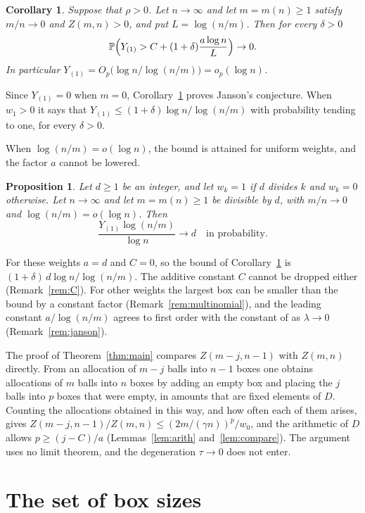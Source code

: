 \documentclass[11pt]{amsart}
\newtheorem{corollary}[theorem]{Corollary}
\newtheorem{proposition}[theorem]{Proposition}
\theoremstyle{remark}
\numberwithin{equation}{section}
\newcommand{\Pp}{\mathbb P}
\begin{document}
\begin{corollary}\label{cor:conj}
Suppose that $\rho>0$. Let $n\to\infty$ and let $m=m(n)\ge1$ satisfy $m/n\to0$ and $Z(m,n)>0$, and put $L=\log(n/m)$. Then for every $\delta>0$
\[
\Pp\Bigl(Y_{(1)}>C+(1+\delta)\frac{a\log n}{L}\Bigr)\to0.
\]
In particular $Y_{(1)}=O_p\bigl(\log n/\log(n/m)\bigr)=o_p(\log n)$.
\end{corollary}

Since $Y_{(1)}=0$ when $m=0$, Corollary~\ref{cor:conj} proves Janson's conjecture. When $w_1>0$ it says that $Y_{(1)}\le(1+\delta)\log n/\log(n/m)$ with probability tending to one, for every $\delta>0$.

When $\log(n/m)=o(\log n)$, the bound is attained for uniform weights, and the factor $a$ cannot be lowered.

\begin{proposition}\label{prop:sharp}
Let $d\ge1$ be an integer, and let $w_k=1$ if $d$ divides $k$ and $w_k=0$ otherwise. Let $n\to\infty$ and let $m=m(n)\ge1$ be divisible by $d$, with $m/n\to0$ and $\log(n/m)=o(\log n)$. Then
\[
\frac{Y_{(1)}\log(n/m)}{\log n}\to d\quad\text{in probability.}
\]
\end{proposition}

For these weights $a=d$ and $C=0$, so the bound of Corollary~\ref{cor:conj} is $(1+\delta)\,d\log n/\log(n/m)$. The additive constant $C$ cannot be dropped either (Remark~\ref{rem:C}). For other weights the largest box can be smaller than the bound by a constant factor (Remark~\ref{rem:multinomial}), and the leading constant $a/\log(n/m)$ agrees to first order with the constant of \cite[Theorem~19.3]{J12} as $\lambda\to0$ (Remark~\ref{rem:janson}).

The proof of Theorem~\ref{thm:main} compares $Z(m-j,n-1)$ with $Z(m,n)$ directly. From an allocation of $m-j$ balls into $n-1$ boxes one obtains allocations of $m$ balls into $n$ boxes by adding an empty box and placing the $j$ balls into $p$ boxes that were empty, in amounts that are fixed elements of $D$. Counting the allocations obtained in this way, and how often each of them arises, gives $Z(m-j,n-1)/Z(m,n)\le(2m/(\gamma n))^p/w_0$, and the arithmetic of $D$ allows $p\ge(j-C)/a$ (Lemmas~\ref{lem:arith} and~\ref{lem:compare}). The argument uses no limit theorem, and the degeneration $\tau\to0$ does not enter.

\section{The set of box sizes}\label{sec:arith}
\end{document}
